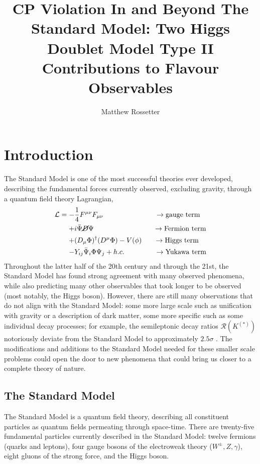 \documentclass[a4paper,12pt]{article}
\title{CP Violation In and Beyond The Standard Model: Two Higgs Doublet Model Type II Contributions to Flavour Observables}
\author{Matthew Rossetter}
\affiliation{Supervised By Alexander Lenz}
\affiliation{MPhys Theoretical Physics, Durham University}
\begin{document}
 
\maketitle

\vspace{-20pt}
\section{Introduction}
\vspace{-5pt}
The Standard Model is one of the most successful theories ever developed, describing the fundamental forces currently observed, excluding gravity, through a quantum field theory Lagrangian, 
\vspace{-15pt}
\begin{equation}
    \label{eq:sm}
    \begin{split}
        \mathcal{L} = -&\frac14 F^{\mu\nu}F_{\mu\nu} \qquad\qquad\qquad\quad\;\to \text{gauge term}\\
                      +& i\bar{\Psi}\cancel{D}\Psi \qquad\qquad\qquad\qquad\;\,\to \text{Fermion term} \\
                      +& (D_\mu\Phi)^\dagger(D^\mu\Phi) - V(\phi) \quad\;\;\,\to \text{Higgs term}\\
                      -& Y_{ij}\bar{\Psi}_i\Phi\Psi_j + h.c. \qquad\qquad\;\to\text{Yukawa term}
    \end{split}
\end{equation}
Throughout the latter half of the 20th century and through the 21st, the Standard Model has found strong agreement with many observed phenomena, while also predicting many other observables that took longer to be observed (most notably, the Higgs boson).
However, there are still many observations that do not align with the Standard Model: some more large scale such as unification with gravity or a description of dark matter, some more specific such as some individual decay processes; for example, the semileptonic decay ratios $\mathcal{R}(K^{(*)})$ notoriously deviate from the Standard Model to approximately $2.5\sigma$ \cite{pdg}.
The modifications and additions to the Standard Model needed for these smaller scale problems could open the door to new phenomena that could bring us closer to a complete theory of nature. 

\subsection{The Standard Model}
The Standard Model is a quantum field theory, describing all constituent particles as quantum fields permeating through space-time. 
There are twenty-five fundamental particles currently described in the Standard Model: twelve fermions (quarks and leptons), four gauge bosons of the electroweak theory ($W^\pm,Z,\gamma$), eight gluons of the strong force, and the Higgs boson.
\end{document}
